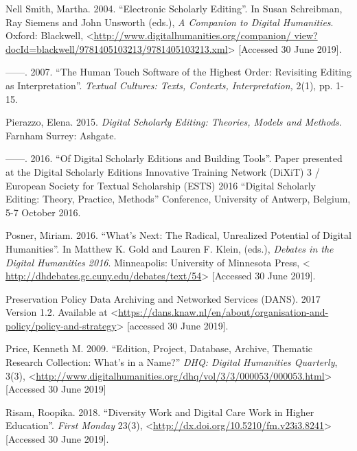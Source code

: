 \begin{paper}
\begin{flushleft}
Nell Smith, Martha. 2004. ``Electronic Scholarly Editing''. In Susan
Schreibman, Ray Siemens and John Unsworth (eds.), \emph{A Companion to
Digital Humanities}. Oxford: Blackwell,
\textless{}\href{http://www.digitalhumanities.org/companion/view?docId=blackwell/9781405103213/9781405103213.xml}{http://www.digitalhumanities.org/companion/ view?docId=blackwell/9781405103213/9781405103213.xml}\textgreater{}
{[}Accessed 30 June 2019{]}.

------. 2007. ``The Human Touch Software of the Highest Order: Revisiting
Editing as Interpretation''. \emph{Textual Cultures: Texts, Contexts,
Interpretation,} 2(1), pp. 1-15.

Pierazzo, Elena. 2015. \emph{Digital Scholarly Editing: Theories, Models
and Methods}. Farnham Surrey: Ashgate.

------. 2016. ``Of Digital Scholarly Editions and Building Tools''. Paper
presented at the Digital Scholarly Editions Innovative Training Network
(DiXiT) 3 / European Society for Textual Scholarship (ESTS) 2016
``Digital Scholarly Editing: Theory, Practice, Methods'' Conference,
University of Antwerp, Belgium, 5-7 October 2016.

Posner, Miriam. 2016. ``What's Next: The Radical, Unrealized Potential
of Digital Humanities''. In Matthew K. Gold and Lauren F. Klein, (eds.),
\emph{Debates in the Digital Humanities 2016}. Minneapolis: University
of Minnesota Press, \textless{}
\href{http://dhdebates.gc.cuny.edu/debates/text/54 }{http://dhdebates.gc.cuny.edu/debates/text/54}\textgreater{} {[}Accessed 30
June 2019{]}.

Preservation Policy Data Archiving and Networked Services (DANS). 2017
Version 1.2. Available at
\textless{}\href{https://dans.knaw.nl/en/about/organisation-and-policy/policy-and-strategy}{https://dans.knaw.nl/en/about/organisation-and-policy/policy-and-strategy}\textgreater{}
{[}accessed 30 June 2019{]}.

Price, Kenneth M. 2009. ``Edition, Project, Database, Archive, Thematic
Research Collection: What's in a Name?'' \emph{DHQ: Digital Humanities
Quarterly}, 3(3),
\textless{}\href{http://www.digitalhumanities.org/dhq/vol/3/3/000053/000053.html}{http://www.digitalhumanities.org/dhq/vol/3/3/000053/000053.html}\textgreater{}
{[}Accessed 30 June 2019{]}

Risam, Roopika. 2018. ``Diversity Work and Digital Care Work in Higher
Education''. \emph{First Monday} 23(3),
\textless{}\href{http://dx.doi.org/10.5210/fm.v23i3.8241}{http://dx.doi.org/10.5210/fm.v23i3.8241}\textgreater{}
{[}Accessed 30 June 2019{]}.


\end{flushleft}
\end{paper}
